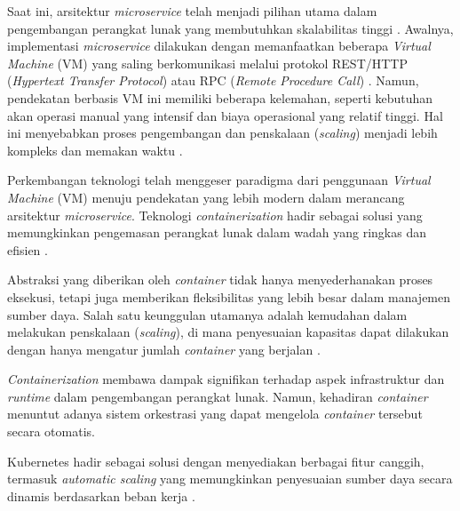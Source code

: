 Saat ini, arsitektur \textit{microservice} telah menjadi pilihan utama dalam
pengembangan perangkat lunak yang membutuhkan skalabilitas tinggi
\cite{Wu2014}. Awalnya, implementasi \textit{microservice} dilakukan dengan
memanfaatkan beberapa \textit{Virtual Machine} (VM) yang saling berkomunikasi
melalui protokol REST/HTTP (\textit{Hypertext Transfer Protocol}) atau RPC
(\textit{Remote Procedure Call}) \cite{Khazaei2016}. Namun, pendekatan berbasis
VM ini memiliki beberapa kelemahan, seperti kebutuhan akan operasi manual yang
intensif dan biaya operasional yang relatif tinggi. Hal ini menyebabkan proses
pengembangan dan penskalaan (\textit{scaling}) menjadi lebih kompleks dan
memakan waktu \cite{Khazaei2016}.
\par
Perkembangan teknologi telah menggeser paradigma dari penggunaan
\textit{Virtual Machine} (VM) menuju pendekatan yang lebih modern dalam
merancang arsitektur \textit{microservice}. Teknologi \textit{containerization}
hadir sebagai solusi yang memungkinkan pengemasan perangkat lunak dalam wadah
yang ringkas dan efisien \cite{Khazaei2016}.
\par
Abstraksi yang diberikan oleh \textit{container} tidak hanya menyederhanakan
proses eksekusi, tetapi juga memberikan fleksibilitas yang lebih besar dalam
manajemen sumber daya. Salah satu keunggulan utamanya adalah kemudahan dalam
melakukan penskalaan (\textit{scaling}), di mana penyesuaian kapasitas dapat
dilakukan dengan hanya mengatur jumlah \textit{container} yang berjalan
\cite{Singh2017}.
\par
\textit{Containerization} \cite{davidbritch} membawa dampak signifikan terhadap aspek infrastruktur dan \textit{runtime} dalam pengembangan perangkat lunak. Namun, kehadiran \textit{container} menuntut adanya sistem orkestrasi yang dapat mengelola \textit{container} tersebut secara otomatis.

Kubernetes hadir sebagai solusi dengan menyediakan berbagai fitur canggih,
termasuk \textit{automatic scaling} yang memungkinkan penyesuaian sumber daya
secara dinamis berdasarkan beban kerja \cite{Leila2018, kubernetes_2021}.

